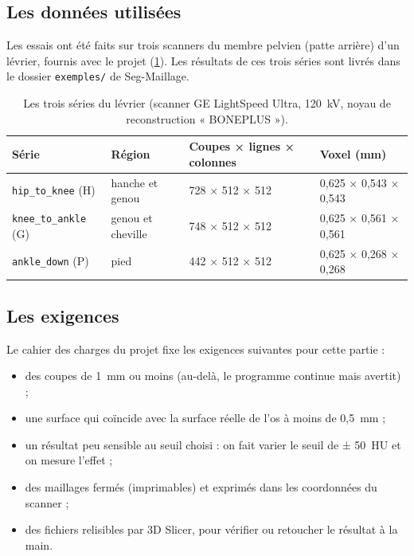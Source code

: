 \documentclass[11pt,a4paper]{article}
\newcommand{\fichier}[1]{\texttt{\small #1}}
\begin{document}
\subsection{Les données utilisées}

Les essais ont été faits sur trois scanners du membre pelvien (patte arrière) d'un lévrier, fournis avec le projet
(\cref{tab-donnees}). Les résultats de ces trois séries sont livrés dans le dossier \fichier{exemples/} de Seg-Maillage.

\begin{table}[h]
\centering\small
\caption{Les trois séries du lévrier (scanner GE LightSpeed Ultra, 120~kV, noyau de reconstruction « BONEPLUS »).}
\label{tab-donnees}
\begin{tabular}{llll}
\toprule
\textbf{Série} & \textbf{Région} & \textbf{Coupes × lignes × colonnes} & \textbf{Voxel (mm)} \\
\midrule
\fichier{hip\_to\_knee} (H) & hanche et genou & 728 × 512 × 512 & 0,625 × 0,543 × 0,543 \\
\fichier{knee\_to\_ankle} (G) & genou et cheville & 748 × 512 × 512 & 0,625 × 0,561 × 0,561 \\
\fichier{ankle\_down} (P) & pied & 442 × 512 × 512 & 0,625 × 0,268 × 0,268 \\
\bottomrule
\end{tabular}
\end{table}

\subsection{Les exigences}

Le cahier des charges du projet fixe les exigences suivantes pour cette partie :
\begin{itemize}
  \item des coupes de 1~mm ou moins (au-delà, le programme continue mais avertit) ;
  \item une surface qui coïncide avec la surface réelle de l'os à moins de 0,5~mm ;
  \item un résultat peu sensible au seuil choisi : on fait varier le seuil de ± 50~HU et on mesure l'effet ;
  \item des maillages fermés (imprimables) et exprimés dans les coordonnées du scanner ;
  \item des fichiers relisibles par 3D Slicer, pour vérifier ou retoucher le résultat à la main.
\end{itemize}
\end{document}
